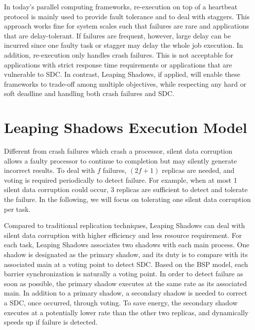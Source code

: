 In today's parallel computing frameworks, re-execution on top of a heartbeat protocol is mainly used to provide fault tolerance and to deal with staggers. This approach works fine for system scales such that failures are rare and applications that are delay-tolerant. If failures are frequent, however, large delay can be incurred since one faulty task or stagger may delay the whole job execution. In addition, re-execution only handles crash failures. This is not acceptable for applications with strict response time requirements or applications that are vulnerable to SDC. In contrast, Leaping Shadows, if applied, will enable these frameworks to trade-off among multiple objectives, while respecting any hard or soft deadline and handling both crash failures and SDC. 

\section{Leaping Shadows Execution Model}
Different from crash failures which crash a processor, silent data corruption allows a faulty processor to continue to completion but may silently generate incorrect results. To deal with $f$ failures, $(2f+1)$ replicas are needed, and voting is required periodically to detect failure. For example, when at most 1 silent data corruption could occur, 3 replicas are sufficient to detect and tolerate the failure. In the following, we will focus on tolerating one silent data corruption per task. 

Compared to traditional replication techniques, Leaping Shadows can deal with silent data corruption with higher efficiency and less resource requirement. For each task, Leaping Shadows associates two shadows with each main process. One shadow is designated as the primary shadow, and its duty is to compare with its associated main at a voting point to detect SDC. Based on the BSP model, each barrier synchronization is naturally a voting point. In order to detect failure as soon as possible,
the primary shadow executes at the same rate as its associated main. In addition to a primary shadow, a secondary shadow is needed to correct a SDC, once occurred, through voting. 
To save energy, the secondary shadow executes at a potentially lower rate than the other two replicas, and dynamically speeds up if failure is detected. 

